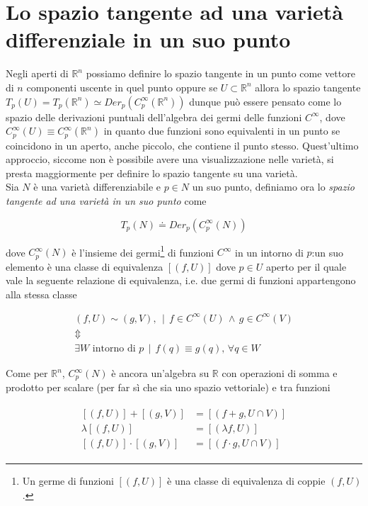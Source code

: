 \section{Lo spazio tangente ad una varietà differenziale in un suo punto}

Negli aperti di $ \mathbb{R}^{n} $ possiamo definire lo spazio tangente in un punto come vettore di $ n $ componenti uscente in quel punto oppure se $ U \subset \mathbb{R}^{n} $ allora lo spazio tangente $ T_{p}(U) = T_{p}(\mathbb{R}^{n}) \simeq Der_{p}(C_{p}^{\infty}(\mathbb{R}^{n})) $ dunque può essere pensato come lo spazio delle derivazioni puntuali dell'algebra dei germi delle funzioni $ C^{\infty} $, dove $ C_{p}^{\infty}(U) \equiv C_{p}^{\infty}(\mathbb{R}^{n}) $ in quanto due funzioni sono equivalenti in un punto se coincidono in un aperto, anche piccolo, che contiene il punto stesso. Quest'ultimo approccio, siccome non è possibile avere una visualizzazione nelle varietà, si presta maggiormente per definire lo spazio tangente su una varietà.\\
Sia $ N $ è una varietà differenziabile e $ p \in N $ un suo punto, definiamo ora lo \textit{spazio tangente ad una varietà in un suo punto} come

\begin{equation}
	T_{p}(N) \doteq Der_{p}(C_{p}^{\infty}(N))
\end{equation}

dove $ C_{p}^{\infty}(N) $ è l'insieme dei germi\footnote{%
	Un germe di funzioni $ [(f,U)] $ è una classe di equivalenza di coppie $ (f,U) $.%
} di funzioni $ C^{\infty} $ in un intorno di $ p $:un suo elemento è una classe di equivalenza $ [(f,U)] $ dove $ p \in U $ aperto per il quale vale la seguente relazione di equivalenza, i.e. due germi di funzioni appartengono alla stessa classe

\begin{gather}
	(f,U) \sim (g,V), \, \mid \, f \in C^{\infty}(U) \, \wedge \, g \in C^{\infty}(V)\nonumber\\
	\Updownarrow\\
	\exists W \text{ intorno di } p \, \mid \, f(q) \equiv g(q), \, \forall q \in W\nonumber
\end{gather}

Come per $ \mathbb{R}^{n} $, $ C_{p}^{\infty}(N) $ è ancora un'algebra su $ \mathbb{R} $ con operazioni di somma e prodotto per scalare (per far sì che sia uno spazio vettoriale) e tra funzioni

\begin{align}
	\begin{split}
		[(f,U)] + [(g,V)] &= [(f+g , U \cap V)]\\
		\lambda [(f,U)] &= [(\lambda f,U)]\\
		[(f,U)] \cdot [(g,V)] &= [(f \cdot g , U \cap V)]
	\end{split}
\end{align}

